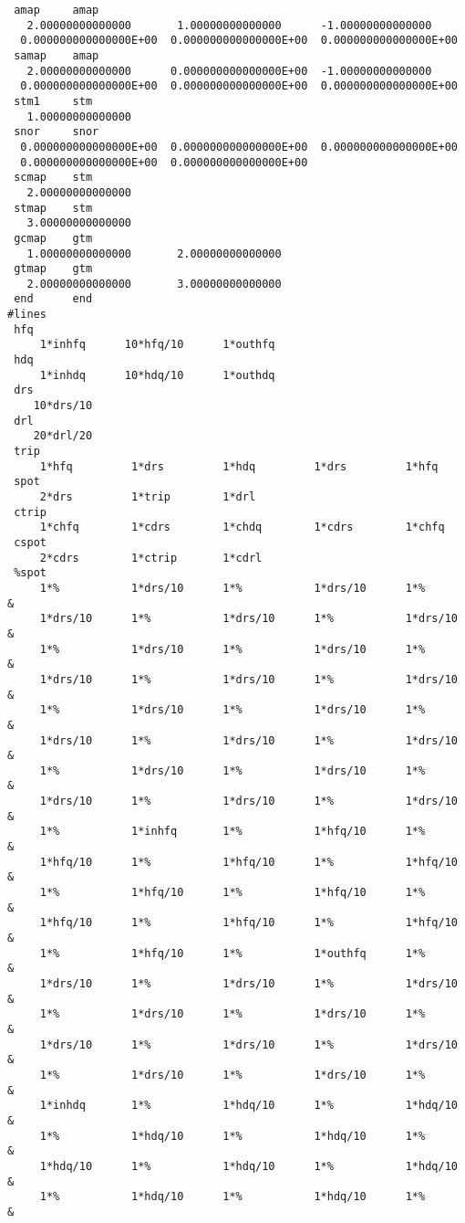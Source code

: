 \begin{footnotesize}
\begin{verbatim}
 amap     amap
   2.00000000000000       1.00000000000000      -1.00000000000000
  0.000000000000000E+00  0.000000000000000E+00  0.000000000000000E+00
 samap    amap
   2.00000000000000      0.000000000000000E+00  -1.00000000000000
  0.000000000000000E+00  0.000000000000000E+00  0.000000000000000E+00
 stm1     stm
   1.00000000000000
 snor     snor
  0.000000000000000E+00  0.000000000000000E+00  0.000000000000000E+00
  0.000000000000000E+00  0.000000000000000E+00
 scmap    stm
   2.00000000000000
 stmap    stm
   3.00000000000000
 gcmap    gtm
   1.00000000000000       2.00000000000000
 gtmap    gtm
   2.00000000000000       3.00000000000000
 end      end
#lines
 hfq
     1*inhfq      10*hfq/10      1*outhfq
 hdq
     1*inhdq      10*hdq/10      1*outhdq
 drs
    10*drs/10
 drl
    20*drl/20
 trip
     1*hfq         1*drs         1*hdq         1*drs         1*hfq
 spot
     2*drs         1*trip        1*drl
 ctrip
     1*chfq        1*cdrs        1*chdq        1*cdrs        1*chfq
 cspot
     2*cdrs        1*ctrip       1*cdrl
 %spot
     1*%           1*drs/10      1*%           1*drs/10      1*%        &
     1*drs/10      1*%           1*drs/10      1*%           1*drs/10   &
     1*%           1*drs/10      1*%           1*drs/10      1*%        &
     1*drs/10      1*%           1*drs/10      1*%           1*drs/10   &
     1*%           1*drs/10      1*%           1*drs/10      1*%        &
     1*drs/10      1*%           1*drs/10      1*%           1*drs/10   &
     1*%           1*drs/10      1*%           1*drs/10      1*%        &
     1*drs/10      1*%           1*drs/10      1*%           1*drs/10   &
     1*%           1*inhfq       1*%           1*hfq/10      1*%        &
     1*hfq/10      1*%           1*hfq/10      1*%           1*hfq/10   &
     1*%           1*hfq/10      1*%           1*hfq/10      1*%        &
     1*hfq/10      1*%           1*hfq/10      1*%           1*hfq/10   &
     1*%           1*hfq/10      1*%           1*outhfq      1*%        &
     1*drs/10      1*%           1*drs/10      1*%           1*drs/10   &
     1*%           1*drs/10      1*%           1*drs/10      1*%        &
     1*drs/10      1*%           1*drs/10      1*%           1*drs/10   &
     1*%           1*drs/10      1*%           1*drs/10      1*%        &
     1*inhdq       1*%           1*hdq/10      1*%           1*hdq/10   &
     1*%           1*hdq/10      1*%           1*hdq/10      1*%        &
     1*hdq/10      1*%           1*hdq/10      1*%           1*hdq/10   &
     1*%           1*hdq/10      1*%           1*hdq/10      1*%        &

\end{verbatim}
\end{footnotesize}
